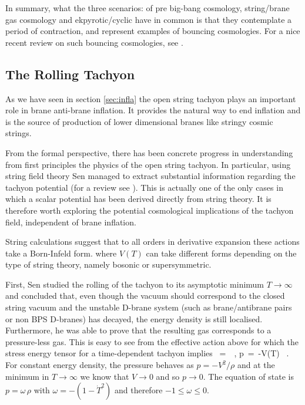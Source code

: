 \medskip
In summary, what the three scenarios: of pre big-bang cosmology, string/brane gas cosmology and ekpyrotic/cyclic have in common is that they
contemplate a period of contraction, and represent examples of bouncing cosmologies.
For a nice recent review on such bouncing cosmologies, see \cite{Brandenberger:2016vhg}.

\subsection{The Rolling Tachyon}

As we have seen in section \ref{sec:infla} the open string tachyon plays an important role in brane anti-brane inflation. It provides the natural way to end inflation and is the source of production of lower dimensional branes like stringy cosmic strings.

From the formal perspective, there has been concrete progress in understanding from first principles the physics of the open string tachyon. In particular, using string field theory Sen managed to extract substantial information regarding the tachyon potential \cite{Sen:2002nu} (for a review see \cite{Sen:2004nf}). This is actually one of the only cases in which a scalar potential has been derived directly from string theory. It is therefore worth exploring the potential cosmological implications of the tachyon field, independent of brane inflation.
 
String calculations suggest that to all orders in derivative expansion these actions take a Born-Infeld form.
\be
\setlength\fboxsep{0.25cm}
\setlength\fboxrule{0.4pt}
\ee
where $V(T)$ can take different forms depending on the type of string theory, 
namely bosonic or supersymmetric. 

First, Sen studied the rolling of the tachyon to its asymptotic minimum 
$T\rightarrow \infty$ and concluded that, even though the vacuum should correspond to the closed string vacuum and the unstable D-brane system 
(such as brane/antibrane pairs or non BPS D-branes) has decayed, the energy density is still localised. Furthermore, 
he was able to prove that the resulting gas corresponds to a pressure-less gas. This is easy to see from the
effective action above for which the stress energy tensor
for a time-dependent tachyon implies
\be
\rho\ =\ \ , \qquad p\ =\ -V(T)
\ .
\ee
 For constant energy density, the pressure behaves as $p=-V^2/\rho$ and at the
 minimum in $T\rightarrow \infty$ we know that $V\rightarrow 0$ and so 
$p\rightarrow 0$. The equation of state is $p= \omega\,\rho$ with $\omega=-(1-\dot T^2)$ and therefore
$-1\leq \omega\leq 0$.

